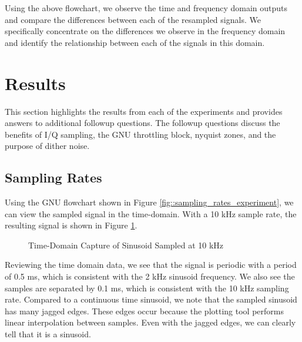 \documentclass{article}
\begin{document}
Using the above flowchart, we observe the time and frequency domain outputs and compare the differences between each of the resampled signals. We specifically concentrate on the differences we observe in the frequency domain and identify the relationship between each of the signals in this domain.

\section{Results}

This section highlights the results from each of the experiments and provides answers to additional followup questions. The followup questions discuss the benefits of I/Q sampling, the GNU throttling block, nyquist zones, and the purpose of dither noise.

\subsection{Sampling Rates}

Using the GNU flowchart shown in Figure \ref{fig::sampling_rates_experiment}, we can view the sampled signal in the time-domain. With a 10 kHz sample rate, the resulting signal is shown in Figure \ref{fig::sampling_rates_time_domain_10k_samp_rate}.

\begin{figure}[H]
	\centerline{}
	\caption{Time-Domain Capture of Sinusoid Sampled at 10 kHz}
	\label{fig::sampling_rates_time_domain_10k_samp_rate}
\end{figure}

Reviewing the time domain data, we see that the signal is periodic with a period of 0.5 ms, which is consistent with the 2 kHz sinusoid frequency. We also see the samples are separated by 0.1 ms, which is consistent with the 10 kHz sampling rate. Compared to a continuous time sinusoid, we note that the sampled sinusoid has many jagged edges. These edges occur because the plotting tool performs linear interpolation between samples. Even with the jagged edges, we can clearly tell that it is a sinusoid.
\end{document}
